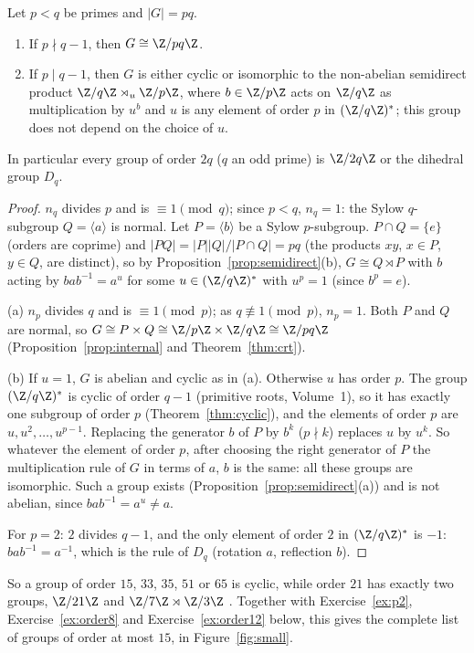 \begin{theorem}\label{thm:pq}
Let $p<q$ be primes and $|G|=pq$.
\begin{enumerate}[label=(\alph*)]
\item If $p\nmid q-1$, then $G\cong\Z/pq\Z$.
\item If $p\mid q-1$, then $G$ is either cyclic or isomorphic to the non-abelian semidirect product $\Z/q\Z\rtimes_u\Z/p\Z$, where $b\in\Z/p\Z$ acts on $\Z/q\Z$ as multiplication by $u^b$ and $u$ is any element of order $p$ in $(\Z/q\Z)^*$; this group does not depend on the choice of $u$.
\end{enumerate}
In particular every group of order $2q$ ($q$ an odd prime) is $\Z/2q\Z$ or the dihedral group $D_q$.
\end{theorem}
\begin{proof}
$n_q$ divides $p$ and is $\equiv1\pmod q$; since $p<q$, $n_q=1$: the Sylow $q$-subgroup $Q=\langle a\rangle$ is normal. Let $P=\langle b\rangle$ be a Sylow $p$-subgroup. $P\cap Q=\{e\}$ (orders are coprime) and $|PQ|=|P||Q|/|P\cap Q|=pq$ (the products $xy$, $x\in P$, $y\in Q$, are distinct), so by Proposition~\ref{prop:semidirect}(b), $G\cong Q\rtimes P$ with $b$ acting by $bab^{-1}=a^u$ for some $u\in(\Z/q\Z)^*$ with $u^p=1$ (since $b^p=e$).

(a) $n_p$ divides $q$ and is $\equiv1\pmod p$; as $q\not\equiv1\pmod p$, $n_p=1$. Both $P$ and $Q$ are normal, so $G\cong P\times Q\cong\Z/p\Z\times\Z/q\Z\cong\Z/pq\Z$ (Proposition~\ref{prop:internal} and Theorem~\ref{thm:crt}).

(b) If $u=1$, $G$ is abelian and cyclic as in (a). Otherwise $u$ has order $p$. The group $(\Z/q\Z)^*$ is cyclic of order $q-1$ (primitive roots, Volume~1), so it has exactly one subgroup of order $p$ (Theorem~\ref{thm:cyclic}), and the elements of order $p$ are $u,u^2,\dots,u^{p-1}$. Replacing the generator $b$ of $P$ by $b^k$ ($p\nmid k$) replaces $u$ by $u^k$. So whatever the element of order $p$, after choosing the right generator of $P$ the multiplication rule of $G$ in terms of $a$, $b$ is the same: all these groups are isomorphic. Such a group exists (Proposition~\ref{prop:semidirect}(a)) and is not abelian, since $bab^{-1}=a^u\ne a$.

For $p=2$: $2$ divides $q-1$, and the only element of order $2$ in $(\Z/q\Z)^*$ is $-1$: $bab^{-1}=a^{-1}$, which is the rule of $D_q$ (rotation $a$, reflection $b$).
\end{proof}

So a group of order $15$, $33$, $35$, $51$ or $65$ is cyclic, while order $21$ has exactly two groups, $\Z/21\Z$ and $\Z/7\Z\rtimes\Z/3\Z$ . Together with Exercise~\ref{ex:p2}, Exercise~\ref{ex:order8} and Exercise~\ref{ex:order12} below, this gives the complete list of groups of order at most $15$, in Figure~\ref{fig:small}.

